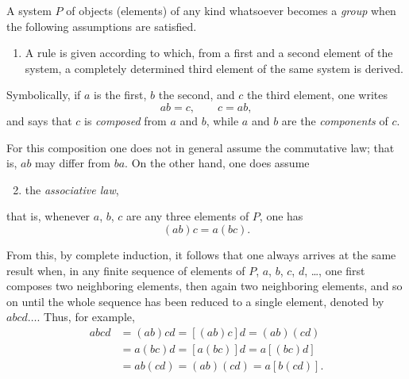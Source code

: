 \documentclass[12pt,a4paper]{book}
\begin{document}
A system $P$ of objects (elements) of any kind whatsoever becomes a \emph{group} when the following assumptions are satisfied.

\begin{enumerate}
\item A rule is given according to which, from a first and a second element of the system, a completely determined third element of the same system is derived.
\end{enumerate}

Symbolically, if $a$ is the first, $b$ the second, and $c$ the third element, one writes
\[
ab=c,\qquad c=ab,
\]
and says that $c$ is \emph{composed} from $a$ and $b$, while $a$ and $b$ are the \emph{components} of $c$.

For this composition one does not in general assume the commutative law; that is, $ab$ may differ from $ba$. On the other hand, one does assume

\begin{enumerate}
\setcounter{enumi}{1}
\item the \emph{associative law},
\end{enumerate}
that is, whenever $a$, $b$, $c$ are any three elements of $P$, one has
\[
(ab)c=a(bc).
\]

From this, by complete induction, it follows that one always arrives at the same result when, in any finite sequence of elements of $P$, $a$, $b$, $c$, $d$, \dots, one first composes two neighboring elements, then again two neighboring elements, and so on until the whole sequence has been reduced to a single element, denoted by $abcd\dots$. Thus, for example,
\begin{align*}
abcd &= (ab)cd = [(ab)c]d = (ab)(cd) \\
     &= a(bc)d = [a(bc)]d = a[(bc)d] \\
     &= ab(cd) = (ab)(cd) = a[b(cd)].
\end{align*}

\bigskip
\end{document}

